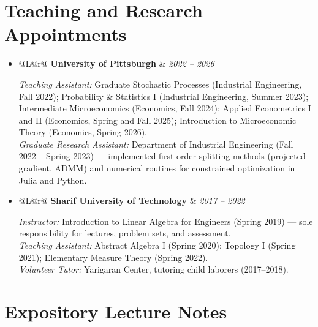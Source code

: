 \documentclass[11pt,letterpaper]{article}
\makeatletter
\newenvironment{cventries}
  {\begin{itemize}[label={},leftmargin=0pt,itemsep=0.40em,topsep=0.30em,
                   parsep=0pt,partopsep=0pt]}
  {\end{itemize}}
\newcommand{\cvline}[2]{%
  \begin{tabularx}{\linewidth}{@{}L@{\hspace{1.5em}}r@{}}
    #1 & #2
  \end{tabularx}\par}
\newcommand{\cventry}[3]{%
  \item \cvline{\textbf{#1}}{\textit{#2}}%
        \vspace{0.12em}\par{\small\sloppy #3}\par}
\makeatother
\begin{document}
\newpage
\section{Teaching and Research Appointments}

\begin{cventries}

  \cventry{University of Pittsburgh}{2022 -- 2026}
          {\textit{Teaching Assistant:}
           Graduate Stochastic Processes (Industrial Engineering, Fall 2022);
           Probability \& Statistics I (Industrial Engineering, Summer 2023);
           Intermediate Microeconomics (Economics, Fall 2024);
           Applied Econometrics I and II (Economics, Spring and Fall 2025);
           Introduction to Microeconomic Theory (Economics, Spring 2026).\\[0.35em]
           \textit{Graduate Research Assistant:}
           Department of Industrial Engineering (Fall 2022 -- Spring 2023) ---
           implemented first-order splitting methods (projected gradient, ADMM)
           and numerical routines for constrained optimization in Julia and Python.}

  \cventry{Sharif University of Technology}{2017 -- 2022}
          {\textit{Instructor:} Introduction to Linear Algebra for
           Engineers (Spring 2019) --- sole responsibility for lectures,
           problem sets, and assessment.\\
           \textit{Teaching Assistant:} Abstract Algebra I (Spring 2020);
           Topology I (Spring 2021); Elementary Measure Theory
           (Spring 2022).\\[0.35em]
           \textit{Volunteer Tutor:} Yarigaran Center, tutoring child
           laborers (2017--2018).}

\end{cventries}

\section{Expository Lecture Notes}
\end{document}
